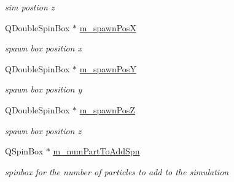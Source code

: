 \begin{DoxyCompactItemize}
\begin{DoxyCompactList}\small\item\em sim postion z \end{DoxyCompactList}\item 
\hypertarget{class_fluid_prop_dock_widget_af29dabe6b5caab6510415ff01ac6bc80}{Q\-Double\-Spin\-Box $\ast$ \hyperlink{class_fluid_prop_dock_widget_af29dabe6b5caab6510415ff01ac6bc80}{m\-\_\-spawn\-Pos\-X}}\label{class_fluid_prop_dock_widget_af29dabe6b5caab6510415ff01ac6bc80}

\begin{DoxyCompactList}\small\item\em spawn box position x \end{DoxyCompactList}\item 
\hypertarget{class_fluid_prop_dock_widget_a8f2f0459bf7cab6f0f4184b538dbb0c0}{Q\-Double\-Spin\-Box $\ast$ \hyperlink{class_fluid_prop_dock_widget_a8f2f0459bf7cab6f0f4184b538dbb0c0}{m\-\_\-spawn\-Pos\-Y}}\label{class_fluid_prop_dock_widget_a8f2f0459bf7cab6f0f4184b538dbb0c0}

\begin{DoxyCompactList}\small\item\em spawn box position y \end{DoxyCompactList}\item 
\hypertarget{class_fluid_prop_dock_widget_a520d14921acb438e884ef66d4d702921}{Q\-Double\-Spin\-Box $\ast$ \hyperlink{class_fluid_prop_dock_widget_a520d14921acb438e884ef66d4d702921}{m\-\_\-spawn\-Pos\-Z}}\label{class_fluid_prop_dock_widget_a520d14921acb438e884ef66d4d702921}

\begin{DoxyCompactList}\small\item\em spawn box position z \end{DoxyCompactList}\item 
\hypertarget{class_fluid_prop_dock_widget_af5ae6a4d95070ebdd3a0dd434cbdeb48}{Q\-Spin\-Box $\ast$ \hyperlink{class_fluid_prop_dock_widget_af5ae6a4d95070ebdd3a0dd434cbdeb48}{m\-\_\-num\-Part\-To\-Add\-Spn}}\label{class_fluid_prop_dock_widget_af5ae6a4d95070ebdd3a0dd434cbdeb48}

\begin{DoxyCompactList}\small\item\em spinbox for the number of particles to add to the simulation \end{DoxyCompactList}\end{DoxyCompactItemize}
